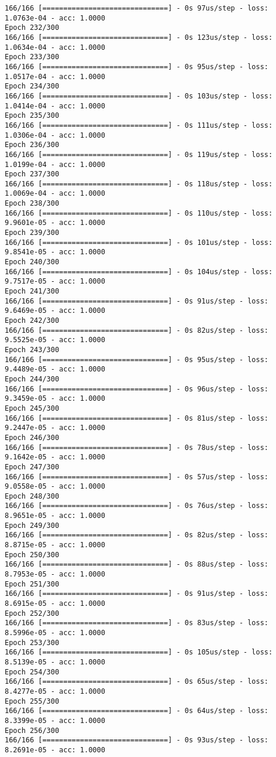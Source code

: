 \documentclass[11pt]{article}
\begin{document}
\begin{Verbatim}[commandchars=\\\{\}]
166/166 [==============================] - 0s 97us/step - loss: 1.0763e-04 - acc: 1.0000
Epoch 232/300
166/166 [==============================] - 0s 123us/step - loss: 1.0634e-04 - acc: 1.0000
Epoch 233/300
166/166 [==============================] - 0s 95us/step - loss: 1.0517e-04 - acc: 1.0000
Epoch 234/300
166/166 [==============================] - 0s 103us/step - loss: 1.0414e-04 - acc: 1.0000
Epoch 235/300
166/166 [==============================] - 0s 111us/step - loss: 1.0306e-04 - acc: 1.0000
Epoch 236/300
166/166 [==============================] - 0s 119us/step - loss: 1.0199e-04 - acc: 1.0000
Epoch 237/300
166/166 [==============================] - 0s 118us/step - loss: 1.0069e-04 - acc: 1.0000
Epoch 238/300
166/166 [==============================] - 0s 110us/step - loss: 9.9601e-05 - acc: 1.0000
Epoch 239/300
166/166 [==============================] - 0s 101us/step - loss: 9.8541e-05 - acc: 1.0000
Epoch 240/300
166/166 [==============================] - 0s 104us/step - loss: 9.7517e-05 - acc: 1.0000
Epoch 241/300
166/166 [==============================] - 0s 91us/step - loss: 9.6469e-05 - acc: 1.0000
Epoch 242/300
166/166 [==============================] - 0s 82us/step - loss: 9.5525e-05 - acc: 1.0000
Epoch 243/300
166/166 [==============================] - 0s 95us/step - loss: 9.4489e-05 - acc: 1.0000
Epoch 244/300
166/166 [==============================] - 0s 96us/step - loss: 9.3459e-05 - acc: 1.0000
Epoch 245/300
166/166 [==============================] - 0s 81us/step - loss: 9.2447e-05 - acc: 1.0000
Epoch 246/300
166/166 [==============================] - 0s 78us/step - loss: 9.1642e-05 - acc: 1.0000
Epoch 247/300
166/166 [==============================] - 0s 57us/step - loss: 9.0558e-05 - acc: 1.0000
Epoch 248/300
166/166 [==============================] - 0s 76us/step - loss: 8.9651e-05 - acc: 1.0000
Epoch 249/300
166/166 [==============================] - 0s 82us/step - loss: 8.8715e-05 - acc: 1.0000
Epoch 250/300
166/166 [==============================] - 0s 88us/step - loss: 8.7953e-05 - acc: 1.0000
Epoch 251/300
166/166 [==============================] - 0s 91us/step - loss: 8.6915e-05 - acc: 1.0000
Epoch 252/300
166/166 [==============================] - 0s 83us/step - loss: 8.5996e-05 - acc: 1.0000
Epoch 253/300
166/166 [==============================] - 0s 105us/step - loss: 8.5139e-05 - acc: 1.0000
Epoch 254/300
166/166 [==============================] - 0s 65us/step - loss: 8.4277e-05 - acc: 1.0000
Epoch 255/300
166/166 [==============================] - 0s 64us/step - loss: 8.3399e-05 - acc: 1.0000
Epoch 256/300
166/166 [==============================] - 0s 93us/step - loss: 8.2691e-05 - acc: 1.0000

\end{Verbatim}
\end{document}
